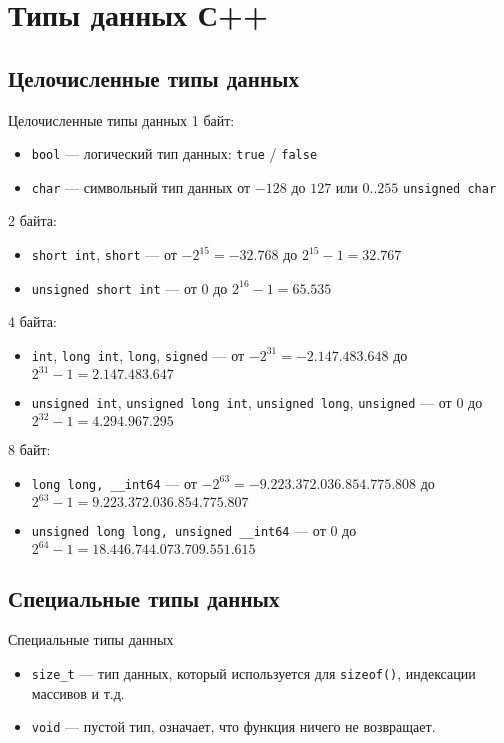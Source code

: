 \section{Типы данных С++}
\subsection{Целочисленные типы данных}

\begin{frame}[t]{Целочисленные типы данных}
  1 байт:
  \begin{itemize}
    \item \texttt{bool} --- логический тип данных: \texttt{true} / \texttt{false}
    \item \texttt{char} --- символьный тип данных от $-128$ до $127$ или $0..255$ \texttt{unsigned char}
  \end{itemize}
  2 байта:
  \begin{itemize}
    \item \texttt{short int}, \texttt{short} --- от $-2^{15}=-32.768$ до $2^{15}-1=32.767$
    \item \texttt{unsigned short int} --- от $0$ до $2^{16}-1=65.535$
  \end{itemize}
  4 байта:
  \begin{itemize}
    \item \texttt{int}, \texttt{long int}, \texttt{long}, \texttt{signed} --- от $-2^{31}=-2.147.483.648$ до $2^{31}-1=2.147.483.647$
    \item \texttt{unsigned int}, \texttt{unsigned long int}, \texttt{unsigned long}, \texttt{unsigned} --- от $0$ до $2^{32}-1=4.294.967.295$
  \end{itemize}
  8 байт:
  \begin{itemize}
    \item \texttt{long long, \_\_int64} --- от $-2^{63}=-9.223.372.036.854.775.808$ до $2^{63}-1=9.223.372.036.854.775.807$
    \item \texttt{unsigned long long, unsigned \_\_int64} --- от $0$ до $2^{64}-1=18.446.744.073.709.551.615$
  \end{itemize}
\end{frame}

\subsection{Специальные типы данных}

\begin{frame}[t]{Специальные типы данных}
  \begin{itemize}
    \item \texttt{size\_t} --- тип данных, 
       который используется для \texttt{sizeof()}, индексации массивов и т.д.
    \item \texttt{void} --- пустой тип, означает, что функция ничего не возвращает. 
  \end{itemize}
\end{frame}

